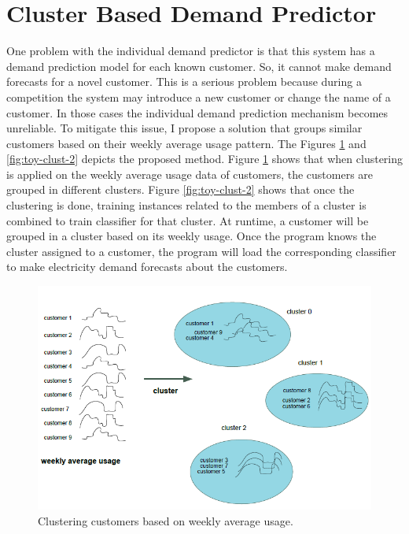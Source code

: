 \section{Cluster Based Demand Predictor}
One problem with the individual demand predictor is that this system has a demand prediction model for each known customer. So, it cannot make demand forecasts for a novel customer. This is a serious problem because during a competition the system may introduce a new customer or change the name of a customer. In those cases the individual demand prediction mechanism becomes unreliable. To mitigate this issue, I propose a solution that groups similar customers based on their weekly average usage pattern. The Figures \ref{fig:toy-clust-1} and \ref{fig:toy-clust-2} depicts the proposed method. Figure \ref{fig:toy-clust-1} shows that when clustering is applied on the weekly average usage data of customers, the customers are grouped in different clusters. Figure \ref{fig:toy-clust-2} shows that once the clustering is done, training instances related to the members of a cluster is combined to train classifier for that cluster. At runtime, a customer will be grouped in a cluster based on its weekly usage. Once the program knows the cluster assigned to a customer, the program will load the corresponding classifier to make electricity demand forecasts about the customers.

\begin{figure}[h!]
  \includegraphics[width=\linewidth]{cluster-toy-1.png}
  \caption{Clustering customers based on weekly average usage. }
  \label{fig:toy-clust-1}
\end{figure}

